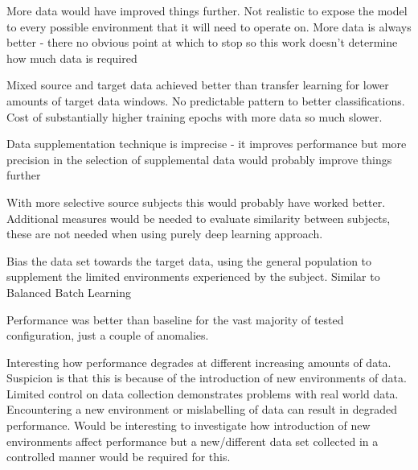 More data would have improved things further. Not realistic to expose the model to every possible environment that it will need to operate on.
More data is always better - there no obvious point at which to stop so this work doesn't determine how much data is required



Mixed source and target data achieved better than transfer learning for lower amounts of target data windows. No predictable pattern to better classifications. Cost of substantially higher training epochs with more data so much slower.

Data supplementation technique is imprecise - it improves performance but more precision in the selection of supplemental data would probably improve things further 

With more selective source subjects this would probably have worked better. Additional measures would be needed to evaluate similarity between subjects, these are not needed when using purely deep learning approach.

Bias the data set towards the target data, using the general population to supplement the limited environments experienced by the subject. Similar to Balanced Batch Learning \cite{Cruciani2020}



Performance was better than baseline for the vast majority of tested configuration, just a couple of anomalies.

Interesting how performance degrades at different increasing amounts of data. Suspicion is that this is because of the introduction of new environments of data. Limited control on data collection demonstrates problems with real world data. Encountering a new environment or mislabelling of data can result in degraded performance. Would be interesting to investigate how introduction of new environments affect performance but a new/different data set collected in a controlled manner would be required for this.



